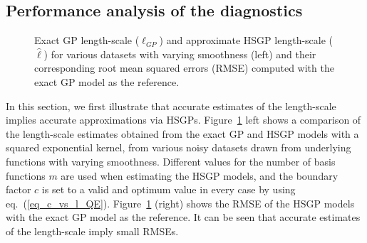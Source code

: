 

\subsection{Performance analysis of the diagnostics}

\begin{figure}
\centering
{}
\caption{Exact GP length-scale ($\ell_{GP}$) and approximate HSGP length-scale ($\hat{\ell}$) for various datasets with varying smoothness (left) and their corresponding root mean squared errors (RMSE) computed with the exact GP model as the reference.}
  \label{fig7_lscale_comparison}
\end{figure}

In this section, we first illustrate that accurate estimates of the length-scale implies accurate approximations via HSGPs. Figure~\ref{fig7_lscale_comparison} left shows a comparison of the length-scale estimates
obtained from the exact GP and HSGP models with a squared exponential kernel, from various noisy datasets drawn from underlying functions with varying smoothness. Different values for the number of basis functions $m$ are used when estimating the HSGP models, and the boundary factor $c$ is set to a valid and optimum value in every case by using eq.~(\ref{eq_c_vs_l_QE}). Figure~\ref{fig7_lscale_comparison} (right) shows the RMSE of the HSGP models with the exact GP model as the reference. It can be seen that accurate estimates of the length-scale imply small RMSEs.

